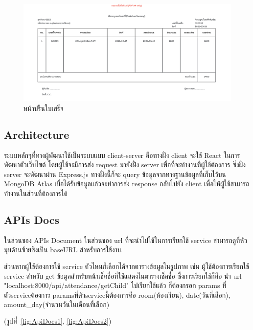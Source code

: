 \begin{itemize}
    \begin{figure}
      \begin{center}
      \includegraphics[width=\linewidth]{images/slipPage.png}
      \end{center}
      \caption[หน้าปริ้นใบเสร็จ]{หน้าปริ้นใบเสร็จ}
      \label{fig:slipPage}
      \end{figure}
\end{itemize}

\subsection{Architecture}

ระบบหลักๆที่ทางผู้พัฒนาใช้เป็นระบบแบบ client-server คือทางฝั่ง client จะใช้ React ในการพัฒนาตัวเว็บไซต์ โดยผู้ใช้จะมีการส่ง request มายังฝั่ง server เพื่อที่จะทำงานที่ผู้ใช้ต้องการ ซึ่งฝั่ง server 
จะพัฒนาผ่าน Express.js ทางฝั่งนี้ก็จะ query ข้อมูลจากทางฐานข้อมูลที่เก็บไว้บน MongoDB Atlas เมื่อได้รับข้อมูลแล้วจะทำการส่ง response กลับไปยัง client เพื่อให้ผู้ใช้สามารถทำงานในส่วนที่ต้องการได้

\subsection{APIs Docs}
ในส่วนของ APIs Document ในส่วนของ url ที่จะนำไปใช้ในการเรียกใช้ service สามารถดูที่หัวมุมด้านซ้ายซึ่งเป็น baseURL สำหรับการใช้งาน

ส่วนหากผู้ใช้ต้องการใช้ service ตัวไหนก็เลือกได้จากตารางข้อมูลในรูปภาพ เช่น ผู้ใช้ต้องการเรียกใช้ service สำหรับ get ข้อมูลสำหรับหน้าเช็คชื่อที่ใช้แสดงในตารางเช็คชื่อ
ซึ่งการเรียกใช้ก็คือ นำ url "localhost:8000/api/attendance/getChild" ไปเรียกใช้แล้ว ก็ต้องกรอก params ที่ตัวserviceต้องการ paramsที่ตัวserviceนี้ต้องการคือ room(ห้องเรียน), date(วันที่เลือก), amount\_day(จำนวนวันในเดือนที่เลือก)

(รูปที่~\ref{fig:ApiDocs1}, \ref{fig:ApiDocs2})

